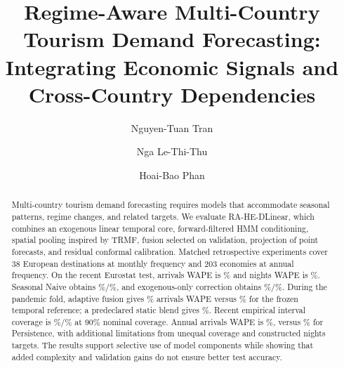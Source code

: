 \documentclass[sigconf]{acmart}
\begin{document}
\title[Regime-Aware Multi-Country Tourism Demand Forecasting]{Regime-Aware Multi-Country Tourism Demand Forecasting: Integrating Economic Signals and Cross-Country Dependencies}

\author{Nguyen-Tuan Tran}

\author{Nga Le-Thi-Thu}

\author{Hoai-Bao Phan}

\renewcommand{\shortauthors}{Tran et al.}

\begin{abstract}
Multi-country tourism demand forecasting requires models that accommodate seasonal patterns, regime changes, and related targets. We evaluate RA-HE-DLinear, which combines an exogenous linear temporal core, forward-filtered HMM conditioning, spatial pooling inspired by TRMF, fusion selected on validation, projection of point forecasts, and residual conformal calibration. Matched retrospective experiments cover 38 European destinations at monthly frequency and 203 economies at annual frequency. On the recent Eurostat test, arrivals WAPE is \ResultFullArrWAPE\% and nights WAPE is \ResultFullNigWAPE\%. Seasonal Naive obtains \ResultNaiveArrWAPE\%/\ResultNaiveNigWAPE\%, and exogenous-only correction obtains \ResultExoArrWAPE\%/\ResultExoNigWAPE\%. During the pandemic fold, adaptive fusion gives \ResultAdaptiveShockArr\% arrivals WAPE versus \ResultFrozenShockArr\% for the frozen temporal reference; a predeclared static blend gives \ResultStaticShockArr\%. Recent empirical interval coverage is \ResultCoverageArr\%/\ResultCoverageNig\% at 90\% nominal coverage. Annual arrivals WAPE is \ResultAnnualFullAllArr\%, versus \ResultAnnualNaiveAllArr\% for Persistence, with additional limitations from unequal coverage and constructed nights targets. The results support selective use of model components while showing that added complexity and validation gains do not ensure better test accuracy.
\end{abstract}
\end{document}
